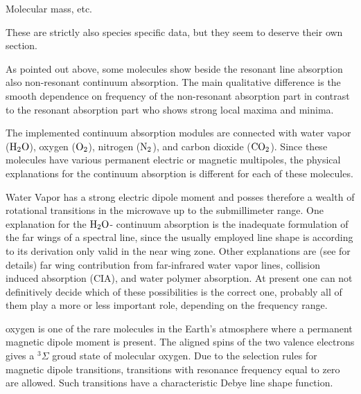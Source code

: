 {Molecular mass, etc. 

These are strictly also species specific data, but they seem to deserve
their own section.













\label{levelb:ContAbs}

As pointed out above, some molecules show beside the resonant line
absorption also non-resonant continuum absorption. The main qualitative
difference is the smooth dependence on frequency of the non-resonant
absorption part in contrast to the resonant absorption part who shows 
strong local maxima and minima.

The implemented continuum absorption modules are connected with water
vapor ($\mbox{H}_2\mbox{O}$), oxygen ($\mbox{O}_2$), nitrogen ($\mbox{N}_2$), and carbon dioxide
($\mbox{CO}_2$). Since these molecules have various permanent electric or magnetic
multipoles, the physical explanations for the continuum absorption is 
different for each of these molecules.

Water Vapor has a strong electric dipole moment and posses therefore a 
wealth of rotational transitions in the microwave up to the submillimeter 
range. One explanation for the $\mbox{H}_2\mbox{O}$- continuum absorption is the inadequate 
formulation of the far wings of a spectral line, since the usually employed 
\citet{vanvleck:45} line shape is according to its derivation only valid 
in the near wing zone. Other explanations are (see \cite{pwr:93} for details) 
far wing contribution from far-infrared water vapor lines, collision induced 
absorption (CIA), and water polymer absorption. At present one can not definitively 
decide which of these possibilities is the correct one, probably all of them 
play a more or less important role, depending on the frequency range.

oxygen is one of the rare molecules in the Earth's atmosphere where a permanent 
magnetic dipole moment is present. The aligned spins of the two valence electrons 
gives a $^{3}\Sigma$ groud state of molecular oxygen. 
Due to the selection rules for magnetic dipole transitions, transitions with 
resonance frequency equal to zero are allowed. Such transitions have a characteristic 
Debye line shape function.

}
